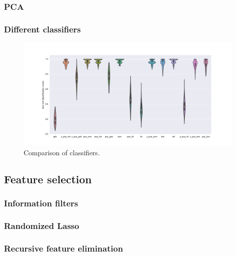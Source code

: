 \documentclass[12pt, a4paper, final, fleqn]{article}
\begin{document}
\subsubsection{PCA}
\subsubsection{Different classifiers}

\begin{figure}[!htb]
\begin{center}
\includegraphics[width=0.89\columnwidth]{comparison_clf_subj_moviedata}
  \caption[Comparison of classifiers]{Comparison of classifiers.
	  \label{fig:clf_comp}}
\end{center}
\end{figure}
\subsection{Feature selection}
\subsubsection{Information filters}
\subsubsection{Randomized Lasso}
\subsubsection{Recursive feature elimination}
\end{document}

